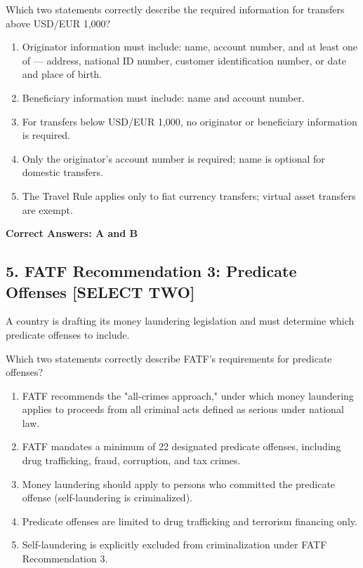 \documentclass[11pt,a4paper]{article}
\begin{document}
	Which two statements correctly describe the required information for transfers above USD/EUR 1,000?
	
	\begin{enumerate}[label=\Alph*.]
		\item Originator information must include: name, account number, and at least one of — address, national ID number, customer identification number, or date and place of birth.
		\item Beneficiary information must include: name and account number.
		\item For transfers below USD/EUR 1,000, no originator or beneficiary information is required.
		\item Only the originator's account number is required; name is optional for domestic transfers.
		\item The Travel Rule applies only to fiat currency transfers; virtual asset transfers are exempt.
	\end{enumerate}
	
	\textbf{Correct Answers: A and B}
	
	\subsection{5. FATF Recommendation 3: Predicate Offenses \textnormal{[SELECT TWO]}}
	
	A country is drafting its money laundering legislation and must determine which predicate offenses to include.
	
	Which two statements correctly describe FATF's requirements for predicate offenses?
	
	\begin{enumerate}[label=\Alph*.]
		\item FATF recommends the "all-crimes approach," under which money laundering applies to proceeds from all criminal acts defined as serious under national law.
		\item FATF mandates a minimum of 22 designated predicate offenses, including drug trafficking, fraud, corruption, and tax crimes.
		\item Money laundering should apply to persons who committed the predicate offense (self-laundering is criminalized).
		\item Predicate offenses are limited to drug trafficking and terrorism financing only.
		\item Self-laundering is explicitly excluded from criminalization under FATF Recommendation 3.
	\end{enumerate}
	
\end{document}
